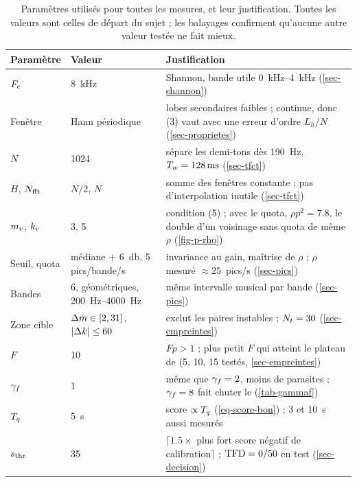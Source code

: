 \begin{table}[!htb]
  \centering\footnotesize
  \caption{Paramètres utilisés pour toutes les mesures, et leur justification. Toutes les
  valeurs sont celles de départ du sujet ; les balayages confirment qu'aucune autre valeur
  testée ne fait mieux.}
  \label{tab-parametres}
  \begin{tabularx}{\linewidth}{@{}llX@{}}
    \toprule
    Paramètre & Valeur & Justification \\
    \midrule
    $F_e$ & \qty{8}{\kilo\hertz} & Shannon, bande utile \qtyrange{0}{4}{\kilo\hertz} (\cref{sec-shannon}) \\
    Fenêtre & Hann périodique & lobes secondaires faibles ; continue, donc (3) vaut avec une erreur d'ordre $L_h/N$ (\cref{sec-proprietes}) \\
    $N$ & 1024 & sépare les demi-tons dès \qty{190}{\hertz}, $T_w = \qty{128}{\milli\second}$ (\cref{sec-tfct}) \\
    $H$, $N_{\mathrm{fft}}$ & $N/2$, $N$ & somme des fenêtres constante ; pas d'interpolation inutile (\cref{sec-tfct}) \\
    $m_v$, $k_v$ & 3, 5 & condition (5) ; avec le quota, $\rho p^2 = \num{7.8}$, le double d'un voisinage sans quota de même $\rho$ (\cref{fig-p-rho}) \\
    Seuil, quota & médiane + \qty{6}{\decibel}, 5 pics/bande/s & invariance au gain, maîtrise de $\rho$ ; $\rho$ mesuré $\approx 25$~pics/s (\cref{sec-pics}) \\
    Bandes & 6, géométriques, \qtyrange{200}{4000}{\hertz} & même intervalle musical par bande (\cref{sec-pics}) \\
    Zone cible & $\Delta m \in [2, 31]$, $|\Delta k| \le 60$ & exclut les paires instables ; $N_t = 30$ (\cref{sec-empreintes}) \\
    $F$ & 10 & $Fp > 1$ ; plus petit $F$ qui atteint le plateau de \TBD{} (5, 10, 15 testés, \cref{sec-empreintes}) \\
    $\gamma_f$ & 1 & même \TBD{} que $\gamma_f = 2$, moins de parasites ; $\gamma_f = 8$ fait chuter le \TBD{} (\cref{tab-gammaf}) \\
    $T_q$ & \qty{5}{\second} & score $\propto T_q$ (\cref{eq-score-bon}) ; 3 et \qty{10}{\second} aussi mesurés \\
    $s_{\mathrm{thr}}$ & 35 & $\lceil \num{1.5} \times{}$ plus fort score négatif de calibration$\rceil$ ; $\mathrm{TFD} = 0/50$ en test (\cref{sec-decision}) \\
    \bottomrule
  \end{tabularx}
\end{table}
